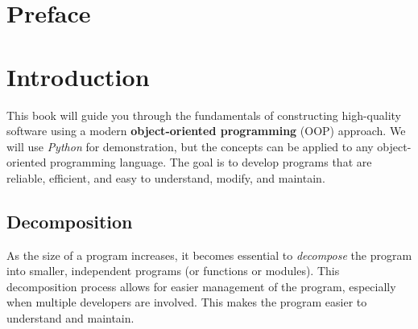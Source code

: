 \documentclass[oneside,11pt,dvipsnames]{book}
\begin{document}


\chapter*{Preface}



\newpage
\tableofcontents


\chapter{Introduction}\label{sec:intro}

This book will guide you through the fundamentals of constructing high-quality software using a modern \textbf{object-oriented programming} (OOP) approach.  We will use \emph{Python} for demonstration, but the concepts can be applied to any object-oriented programming language.  The goal is to develop programs that are reliable, efficient, and easy to understand, modify, and maintain.


\section{Decomposition}\label{sec:decomposition}

As the size of a program increases, it becomes essential to \emph{decompose} the program into smaller, independent programs (or functions or modules). This decomposition process allows for easier management of the program, especially when multiple developers are involved.   This makes the program easier to understand and maintain.
\end{document}

